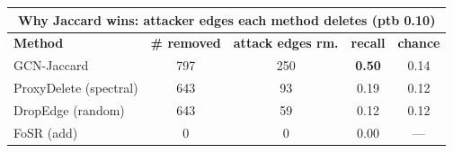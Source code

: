 \documentclass[border=14pt]{standalone}
\begin{document}
\small
\begin{tabular}{@{}lcccc@{}}
\multicolumn{5}{c}{\normalsize\textbf{Why Jaccard wins: attacker edges each method deletes (ptb 0.10)}}\\[5pt]
\toprule
\textbf{Method} & \textbf{\# removed} & \textbf{attack edges rm.} & \textbf{recall} & \textbf{chance}\\
\midrule
GCN-Jaccard            & 797 & 250 & \textbf{0.50} & 0.14\\
ProxyDelete (spectral) & 643 & 93  & 0.19 & 0.12\\
DropEdge (random)      & 643 & 59  & 0.12 & 0.12\\
FoSR (add)             & 0   & 0   & 0.00 & ---\\
\bottomrule
\end{tabular}
\end{document}

